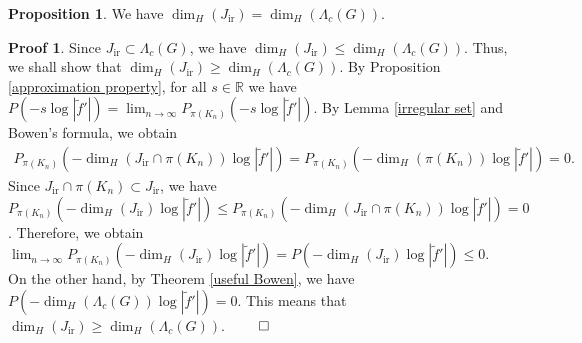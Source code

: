 \documentclass{article}
\theoremstyle{definition}
\newtheorem{prop}[thm]{Proposition}
\newtheorem*{pf}{Proof}
\begin{document}
\begin{prop}
    We have $\dim_H(J_{\text{ir}})=\dim_H(\Lambda_c(G))$.
\end{prop}
\begin{pf}
    Since $J_{\text{ir}}\subset\Lambda_c(G)$, we have $\dim_H(J_{\text{ir}})\leq\dim_H(\Lambda_c(G))$. Thus, we shall show that $\dim_H(J_{\text{ir}})\geq\dim_H(\Lambda_c(G))$. By Proposition \ref{approximation property}, for all $s\in\mathbb{R}$ we have $P(-s\log|\tilde f'|)=\lim_{n\to\infty}P_{\pi(K_n)}(-s\log|\tilde f'|)$. By Lemma \ref{irregular set} and Bowen's formula, we obtain
    \begin{align*}
    P_{\pi(K_n)}(-\dim_H(J_{\text{ir}}\cap \pi(K_n))\log|\tilde f'|)=P_{\pi(K_n)}(-\dim_H(\pi(K_n))\log|\tilde f'|)=0.
    \end{align*}
    Since $J_{\text{ir}}\cap \pi(K_n)\subset J_{\text{ir}}$, we have $P_{\pi(K_n)}(-\dim_H(J_{\text{ir}})\log|\tilde f'|)\leq P_{\pi(K_n)}(-\dim_H(J_{\text{ir}}\cap \pi(K_n))\log|\tilde f'|)=0$. Therefore, we obtain $\lim_{n\to\infty}P_{\pi(K_n)}(-\dim_H(J_{\text{ir}})\log|\tilde f'|)=P(-\dim_H(J_{\text{ir}})\log|\tilde f'|)\leq0$. On the other hand, by Theorem \ref{useful Bowen}, we have $P(-\dim_H(\Lambda_c(G))\log|\tilde f'|)=0$. This means that $\dim_H(J_{\text{ir}})\geq\dim_H(\Lambda_c(G))$.  $\qed$
\end{pf}
\end{document}

